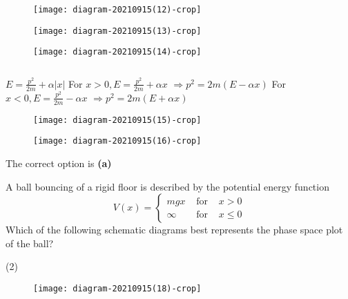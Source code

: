 \begin{enumerate}
\begin{tasks}
\begin{figure}[H]
	\end{figure}
	\task[\textbf{B.}]\begin{figure}[H]
		\centering
		\texttt{[image: diagram-20210915(12)-crop]}
	\end{figure}
	\task[\textbf{C.}]\begin{figure}[H]
		\centering
		\texttt{[image: diagram-20210915(13)-crop]}
	\end{figure}
	\task[\textbf{D.}]\begin{figure}[H]
		\centering
		\texttt{[image: diagram-20210915(14)-crop]}
	\end{figure}
\end{tasks}
\begin{answer}$\left. \right. $\\
\begin{minipage}{0.5\textwidth}
 $E=\frac{p^{2}}{2 m}+\alpha|x|$
	For $x>0, E=\frac{p^{2}}{2 m}+\alpha x$ $\Rightarrow p^{2}=2 m(E-\alpha x)$
	For $x<0, E=\frac{p^{2}}{2 m}-\alpha x$ $\Rightarrow p^{2}=2 m(E+\alpha x)$
\end{minipage}
\begin{minipage}{0.5\textwidth}
\begin{figure}[H]
	\centering
	\texttt{[image: diagram-20210915(15)-crop]}
\end{figure}
\begin{figure}[H]
	\centering
	\texttt{[image: diagram-20210915(16)-crop]}
\end{figure}
\end{minipage}
The correct option is \textbf{(a)}	
\end{answer}
\begin{minipage}{\textwidth}
	\item A ball bouncing of a rigid floor is described by the potential energy function
	$$
	V(x)=\left\{\begin{array}{lll}
	m g x & \text { for } & x>0 \\
	\infty & \text { for } & x \leq 0
	\end{array}\right.
	$$
	Which of the following schematic diagrams best represents the phase space plot of the ball?
\end{minipage}
\begin{tasks}(2)
	\task[\textbf{A.}]\begin{figure}[H]
		\centering
		\texttt{[image: diagram-20210915(18)-crop]}
	\end{figure}

\end{tasks}
\end{enumerate}
